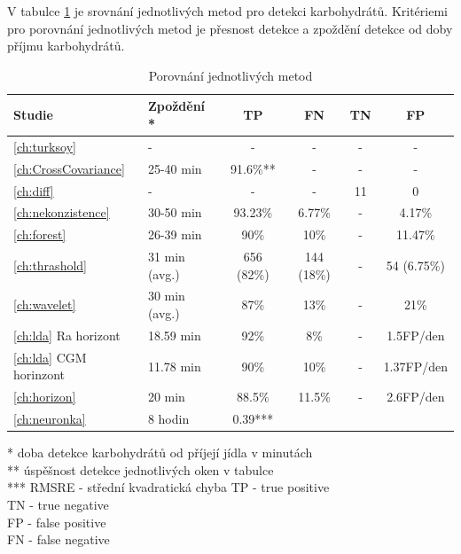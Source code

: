 V tabulce \ref{tab:res} je srovnání jednotlivých metod pro detekci karbohydrátů. Kritériemi pro porovnání jednotlivých metod je přesnost detekce a zpoždění detekce od doby příjmu karbohydrátů.

\begin{table}[H]
\caption{Porovnání jednotlivých metod}
\label{tab:res}
\centering
\begin{tabular}{|l|l|c|c|c|c|}
\hline 
\textbf{Studie} & \textbf{Zpoždění *} & \textbf{TP} & \textbf{FN} & \textbf{TN} & \textbf{FP}\tabularnewline
\hline 
\hline 
\ref{ch:turksoy} & - & - & - & - & -\tabularnewline
\hline 
\ref{ch:CrossCovariance} & 25-40 min & 91.6\%{**} & - & - & -\tabularnewline
\hline 
\ref{ch:diff} & - & - & - & 11 & 0\tabularnewline
\hline 
\ref{ch:nekonzistence} & 30-50 min & 93.23\% & 6.77\% & - & 4.17\%\tabularnewline
\hline 
\ref{ch:forest} & 26-39 min & 90\% & 10\% & - & 11.47\%\tabularnewline
\hline 
\ref{ch:thrashold} & 31 min (avg.) & 656 (82\%) & 144 (18\%) & - & 54 (6.75\%)\tabularnewline
\hline 
\ref{ch:wavelet} & 30 min (avg.) & 87\% & 13\% & - & 21\%\tabularnewline
\hline 
\ref{ch:lda} Ra horizont & 18.59 min & 92\% & 8\% & - & 1.5FP/den\tabularnewline
\hline 
\ref{ch:lda} CGM horinzont & 11.78 min & 90\% & 10\% & - & 1.37FP/den\tabularnewline
\hline
\ref{ch:horizon} & 20 min & 88.5\% & 11.5\% & - & 2.6FP/den\tabularnewline
\hline
\ref{ch:neuronka} & 8 hodin & 0.39{***} & & & \tabularnewline
\hline
\end{tabular}
\begin{flushleft}
* doba detekce karbohydrátů od příjejí jídla v minutách\\
{**} úspěšnost detekce jednotlivých oken v tabulce\\
{***} RMSRE - střední kvadratická chyba
TP - true positive\\
TN - true negative\\
FP - false positive\\
FN - false negative\\
\end{flushleft}
\end{table}